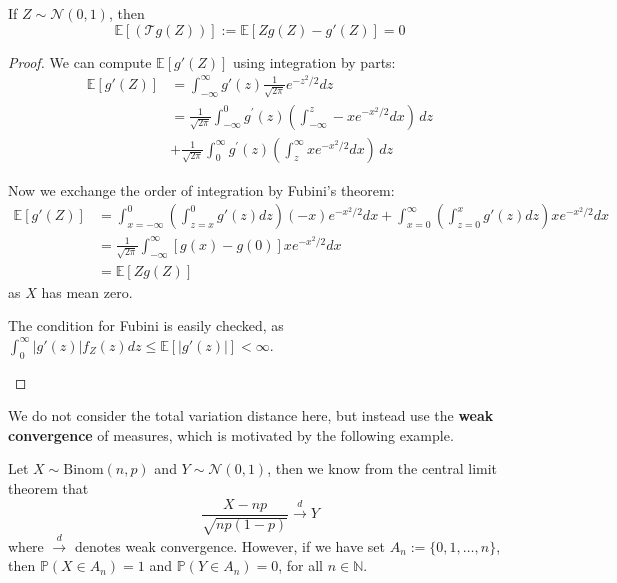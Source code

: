 \documentclass{article}
\begin{document}
\begin{theorem}\label{thm:stein_operator_normal}
    If $Z\sim \mathcal{N}(0, 1)$, then 
    \begin{equation*}
        \mathbb{E}[(\mathcal{T}g(Z))]:=\mathbb{E}[Zg(Z) - g'(Z)] = 0
    \end{equation*}
\end{theorem}

\begin{proof}
    We can compute $\mathbb{E}[g'(Z)]$ using integration by parts:
    \begin{align*}
        \mathbb{E}[g'(Z)] &= \int_{-\infty}^\infty g'(z) \frac{1}{\sqrt{2\pi}} e^{-z^2/2} dz\\
        &= {\frac{1}{\sqrt{2\pi}}}\int_{-\infty}^{0}g^{\prime}(z)\left(\int_{-\infty}^{z}-x e^{-x^{2}/2}d x\right)\,d z \\
        &+ {\frac{1}{\sqrt{2\pi}}}\int_{0}^{\infty}g^{\prime}(z)\left(\int_{z}^{\infty}x e^{-x^{2}/2}d x\right)\,d z
    \end{align*}

    Now we exchange the order of integration by Fubini's theorem:
    \begin{align*}
        \mathbb{E}[g'(Z)] &= \int_{x=-\infty}^0 \left(\int_{z=x}^0 g'(z) dz\right) (-x) e^{-x^2/2} dx + \int_{x=0}^\infty \left(\int_{z=0}^x g'(z) dz\right) xe^{-x^2/2} dx\\
        &={\frac{1}{\sqrt{2\pi}}}\int_{-\infty}^{\infty}[g(x)-g(0)]x e^{-x^{2}/2}d x \\
        &=\mathbb{E}[Z g(Z)]
    \end{align*}
    as $X$ has mean zero.
    \begin{unexaminable}
        The condition for Fubini is easily checked, as $\int_0^\infty |g'(z)| f_Z(z) dz \leq \mathbb{E}[|g'(z)|] < \infty$.
    \end{unexaminable}
\end{proof}

We do not consider the total variation distance here, but instead use the \textbf{weak convergence} of measures, which is motivated by the following example.  

\begin{example}

    Let $X\sim \mathrm{Binom}(n,p)$ and $Y\sim \mathcal{N}(0,1)$, then we know from the central limit theorem that
    \begin{equation*}
        \frac{X-np}{\sqrt{np(1-p)}} \xrightarrow{d} Y
    \end{equation*}
    where $\xrightarrow{d}$ denotes weak convergence. However, if we have set $A_n :=\{0, 1, \ldots, n\}$, then $\mathbb{P}(X\in A_n) = 1$ and $\mathbb{P}(Y\in A_n) = 0$, for all $n\in \mathbb{N}$.
\end{example}
\end{document}
